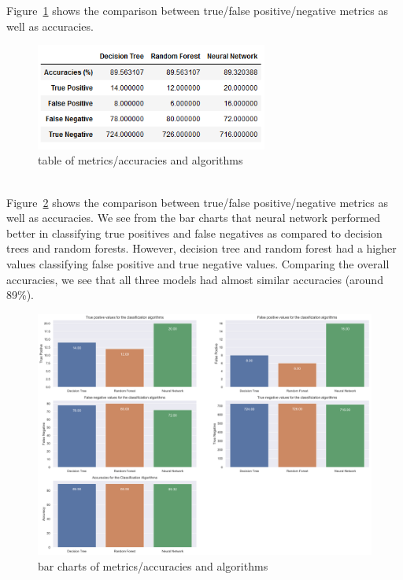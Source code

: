 Figure~\ref{fig:fig4} shows the comparison between true/false positive/negative metrics as well as accuracies. 
\begin{figure}[!ht]
 \centering
\includegraphics[width=3.0in]{assignment2/1-5_table.png}
\caption{\label{fig:fig4}table of metrics/accuracies and algorithms}
\end{figure}
\\
Figure~\ref{fig:fig5} shows the comparison between true/false positive/negative metrics as well as accuracies. We see from the bar charts that neural network performed better in classifying true positives and false negatives as compared to decision trees and random forests. However, decision tree and random forest had a higher values classifying false positive and true negative values. Comparing the overall accuracies, we see that all three models had almost similar accuracies (around 89\%).
\begin{figure}[!ht]
 \centering
\includegraphics[width=5.1in]{assignment2/barcharts_algorithms.png}
\caption{\label{fig:fig5}bar charts of metrics/accuracies and algorithms}
\end{figure}

\\


\newpage
